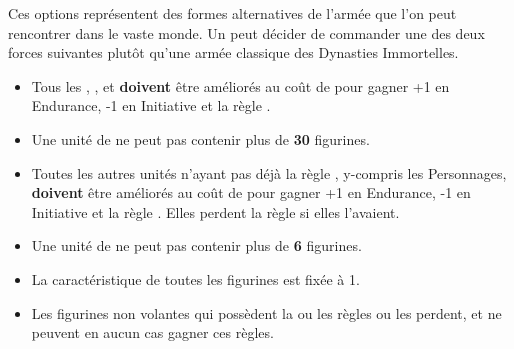 \enditemlistonecol

\closearmyarmoury






\newpage
{}

\spaceaftersection{}

\begin{center}
\noindent Ces options représentent des formes alternatives de l'armée que l'on peut rencontrer dans le vaste monde. Un \pharaoh{} peut décider de commander une des deux forces suivantes plutôt qu'une armée classique des Dynasties Immortelles.
\end{center}

\begin{multicols}{2}\raggedcolumns

\begin{center}\armynewsubsection{\commanderoftheterracottaarmy}\end{center}

\begin{itemize}[label={-}, leftmargin=*]
\item Tous les \skeletons{}, \skeletonarchers{}, \skeletoncavalry{} et \necropolisguards{} \textbf{doivent} être améliorés au coût de \permodel{} pour gagner +1 en Endurance, -1 en Initiative et la règle \undeadconstruct{}.

\item Une unité de \necropolisguards{} ne peut pas contenir plus de \textbf{30} figurines.

\item Toutes les autres unités n'ayant pas déjà la règle \undeadconstruct{}, y-compris les Personnages, \textbf{doivent} être améliorés au coût de \permodel{} pour gagner +1 en Endurance, -1 en Initiative et la règle \undeadconstruct{}. Elles perdent la règle \flammable{} si elles l'avaient.

\item Une unité de \skeletonchariots{} ne peut pas contenir plus de \textbf{6} figurines.

\item La caractéristique \risen{} de toutes les figurines est fixée à 1.

\item Les figurines non volantes qui possèdent la ou les règles \undergroundambush{} ou \lighttroops{} les perdent, et ne peuvent en aucun cas gagner ces règles.


\end{itemize}
\end{multicols}
